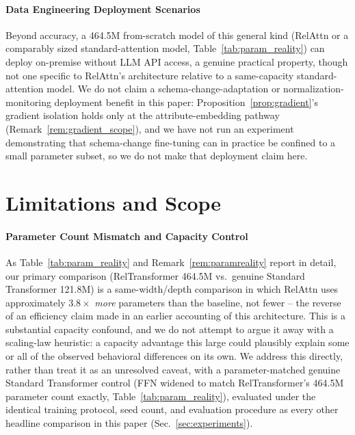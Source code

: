 \documentclass[review]{elsarticle}
\begin{document}
\paragraph{Data Engineering Deployment Scenarios}
Beyond accuracy, a 464.5M from-scratch model of this general kind (RelAttn or a comparably sized standard-attention model, Table~\ref{tab:param_reality}) can deploy on-premise without LLM API access, a genuine practical property, though not one specific to RelAttn's architecture relative to a same-capacity standard-attention model. We do not claim a schema-change-adaptation or normalization-monitoring deployment benefit in this paper: Proposition~\ref{prop:gradient}'s gradient isolation holds only at the attribute-embedding pathway (Remark~\ref{rem:gradient_scope}), and we have not run an experiment demonstrating that schema-change fine-tuning can in practice be confined to a small parameter subset, so we do not make that deployment claim here.

\section{Limitations and Scope}
\label{sec:limitations}

\paragraph{Parameter Count Mismatch and Capacity Control}
As Table~\ref{tab:param_reality} and Remark~\ref{rem:paramreality} report in detail, our primary comparison (RelTransformer 464.5M vs.\ genuine Standard Transformer 121.8M) is a same-width/depth comparison in which RelAttn uses approximately $3.8\times$ \emph{more} parameters than the baseline, not fewer -- the reverse of an efficiency claim made in an earlier accounting of this architecture. This is a substantial capacity confound, and we do not attempt to argue it away with a scaling-law heuristic: a capacity advantage this large could plausibly explain some or all of the observed behavioral differences on its own. We address this directly, rather than treat it as an unresolved caveat, with a parameter-matched genuine Standard Transformer control (FFN widened to match RelTransformer's 464.5M parameter count exactly, Table~\ref{tab:param_reality}), evaluated under the identical training protocol, seed count, and evaluation procedure as every other headline comparison in this paper (Sec.~\ref{sec:experiments}).
\end{document}
